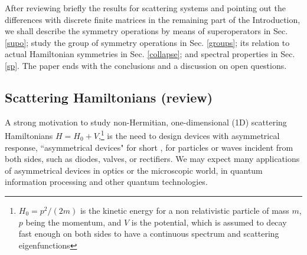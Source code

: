 After reviewing briefly the results for scattering systems and pointing out the differences with discrete finite matrices
in the remaining part of the Introduction, we shall describe the symmetry operations by means of superoperators  in Sec. \ref{supo};
study the group of symmetry operations in Sec. \ref{groups};   its relation to actual Hamiltonian symmetries
 in Sec. \ref{collapse}; and spectral properties in Sec. \ref{sp}.
The paper ends with the conclusions and a discussion on open questions.
%
%
\subsection{Scattering Hamiltonians (review)}
%
%
A strong motivation to study non-Hermitian, one-dimensional (1D) scattering Hamiltonians  $H=H_0+V$,\footnote{ $H_{0}=p^{2}/(2m)$ is the kinetic energy for a non relativistic particle of mass $m$,  $p$ being the momentum,  and $V$ is the potential, which is assumed to decay fast enough on both sides to have a continuous spectrum and scattering eigenfunctions}
is  the need to design devices with asymmetrical response,  ``asymmetrical devices" for short   \cite{Ruschhaupt2017},
for particles or waves incident from both sides, such as diodes, valves,  or rectifiers.
We may expect
many applications of asymmetrical devices in optics or the microscopic world,
in quantum information processing  and other quantum technologies.

